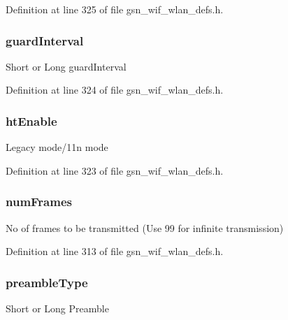 Definition at line 325 of file gsn\_\-wif\_\-wlan\_\-defs.h.

\hypertarget{a00187_ab98fc9858671817369884eb76059060c}{
\subsubsection[{guardInterval}]{ {\bf guardInterval}}}
\label{a00187_ab98fc9858671817369884eb76059060c}
Short or Long guardInterval 

Definition at line 324 of file gsn\_\-wif\_\-wlan\_\-defs.h.

\hypertarget{a00187_aa9dd146b0056ea098e9be601c2dc23e8}{
\subsubsection[{htEnable}]{ {\bf htEnable}}}
\label{a00187_aa9dd146b0056ea098e9be601c2dc23e8}
Legacy mode/11n mode 

Definition at line 323 of file gsn\_\-wif\_\-wlan\_\-defs.h.

\hypertarget{a00187_a4e13c180765684684613fee7c7d86666}{
\subsubsection[{numFrames}]{ {\bf numFrames}}}
\label{a00187_a4e13c180765684684613fee7c7d86666}
No of frames to be transmitted (Use 99 for infinite transmission) 

Definition at line 313 of file gsn\_\-wif\_\-wlan\_\-defs.h.

\hypertarget{a00187_a1af7a22bf7a18ef09da23ae8d0e08d22}{
\subsubsection[{preambleType}]{ {\bf preambleType}}}
\label{a00187_a1af7a22bf7a18ef09da23ae8d0e08d22}
Short or Long Preamble 

